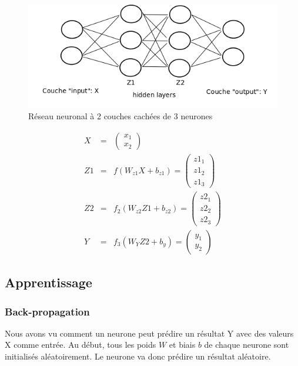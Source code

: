 \documentclass[11pt,a4paper]{report}
\begin{document}
    \begin{figure}[!h]
    \center
    \includegraphics[scale=0.74]{ressources/nn_presentation_3.png}
    \caption{Réseau neuronal à 2 couches cachées de 3 neurones}
    \end{figure} 
    
    \begin{eqnarray}
    X &=& \begin{pmatrix} x_1 \\ x_2  \end{pmatrix}     \\
    Z1 &=& f\left(W_{z1}X+b_{z1}\right) = \begin{pmatrix} z1_{1} \\ z1_2 \\ z1_3  \end{pmatrix} \\
    Z2 &=& f_2\left(W_{z2}Z1+b_{z2}\right) = \begin{pmatrix} z2_{1} \\ z2_2 \\ z2_3  \end{pmatrix} \\
    Y &=& f_3\left( W_YZ2+b_y \right) = \begin{pmatrix} y_{1} \\ y_2  \end{pmatrix} 
    \end{eqnarray}
    

  \subsection{Apprentissage}
  
  \subsubsection{Back-propagation}
  
    \par Nous avons vu comment un neurone peut prédire un résultat Y avec des valeurs X comme entrée. Au début, tous les poids $W$ et biais $b$ de chaque neurone sont initialisés aléatoirement. Le neurone va donc prédire un résultat aléatoire. 
  
\end{document}

